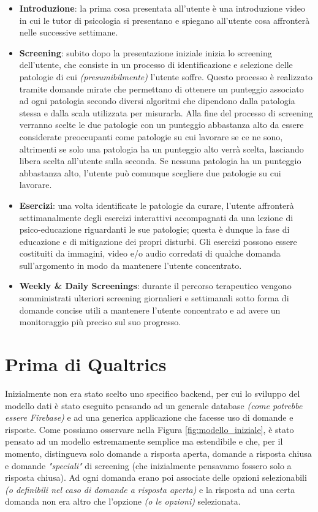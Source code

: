 \begin{itemize}
\item \textbf{Introduzione}: la prima cosa presentata all'utente è una introduzione video in cui le tutor di psicologia si presentano e spiegano all'utente cosa affronterà nelle successive settimane.
\item \textbf{Screening}: subito dopo la presentazione iniziale inizia lo screening dell'utente, che consiste in un processo di identificazione e selezione delle patologie di cui \textit{(presumibilmente)} l'utente soffre. Questo processo è realizzato tramite domande mirate che permettano di ottenere un punteggio associato ad ogni patologia secondo diversi algoritmi che dipendono dalla patologia stessa e dalla scala utilizzata per misurarla. Alla fine del processo di screening verranno scelte le due patologie con un punteggio abbastanza alto da essere considerate preoccupanti come patologie su cui lavorare se ce ne sono, altrimenti se solo una patologia ha un punteggio alto verrà scelta, lasciando libera scelta all'utente sulla seconda. Se nessuna patologia ha un punteggio abbastanza alto, l'utente può comunque scegliere due patologie su cui lavorare.
\item \textbf{Esercizi}: una volta identificate le patologie da curare, l'utente affronterà settimanalmente degli esercizi interattivi accompagnati da una lezione di psico-educazione riguardanti le sue patologie; questa è dunque la fase di educazione e di mitigazione dei propri disturbi. Gli esercizi possono essere costituiti da immagini, video e/o audio corredati di qualche domanda sull'argomento in modo da mantenere l'utente concentrato.
\item \textbf{Weekly \& Daily Screenings}: durante il percorso terapeutico vengono somministrati ulteriori screening giornalieri e settimanali sotto forma di domande concise utili a mantenere l'utente concentrato e ad avere un monitoraggio più preciso sul suo progresso.
\end{itemize}

\newpage

\section{Prima di Qualtrics}
Inizialmente non era stato scelto uno specifico backend, per cui lo sviluppo del modello dati è stato eseguito pensando ad un generale database \textit{(come potrebbe essere Firebase)} e ad una generica applicazione che facesse uso di domande e risposte. Come possiamo osservare nella Figura \ref{fig:modello_iniziale}, è stato pensato ad un modello estremamente semplice ma estendibile e che, per il momento, distingueva solo domande a risposta aperta, domande a risposta chiusa e domande \textit{"speciali"} di screening (che inizialmente pensavamo fossero solo a risposta chiusa).
Ad ogni domanda erano poi associate delle opzioni selezionabili \textit{(o definibili nel caso di domande a risposta aperta)} e la risposta ad una certa domanda non era altro che l'opzione \textit{(o le opzioni)} selezionata.

